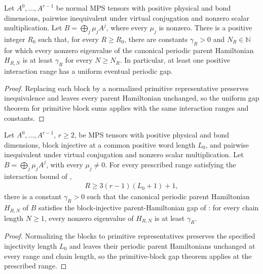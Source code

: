 \begin{lemma}
    \label{thm:normal_block_sum_parent_gap}
    \leanok
    Let $A^0,\ldots,A^{r-1}$ be normal MPS tensors with positive physical and
    bond dimensions, pairwise inequivalent under virtual conjugation and
    nonzero scalar multiplication. Let $B=\bigoplus_j\mu_j A^j$, where
    every $\mu_j$ is nonzero.
    There is a positive integer $R_0$ such that, for every $R\geq R_0$,
    there are constants $\gamma_R>0$ and $N_R\in\mathbb N$ for which
    every nonzero eigenvalue of the canonical periodic parent Hamiltonian
    $H_{R,N}$ is at least $\gamma_R$ for every $N\geq N_R$.
    In particular, at least one positive interaction range has a uniform
    eventual periodic gap.
\end{lemma}
\begin{proof}\leanok
    Replacing each block by a normalized primitive representative preserves
    inequivalence and leaves every parent Hamiltonian unchanged, so the uniform
    gap theorem for primitive block sums applies with the same
    interaction ranges and constants.
\end{proof}

\begin{lemma}
    \label{thm:normal-block-parent-gap-three-block-bound}
    \leanok
    Let $A^0,\ldots,A^{r-1}$, $r\geq2$, be MPS tensors with positive
    physical and bond dimensions, block injective at a common positive word
    length $L_0$, and pairwise inequivalent under virtual conjugation and nonzero
    scalar multiplication. Let $B=\bigoplus_j\mu_j A^j$, with every
    $\mu_j\ne0$. For every prescribed range satisfying the interaction bound of
    \cite[Theorem~12]{PerezGarcia2007Matrix},
    \begin{align}
        R\geq3(r-1)(L_0+1)+1,
    \end{align}
    there is a constant $\gamma_R>0$ such that the canonical periodic parent
    Hamiltonian $H_{R,N}$ of $B$ satisfies the block-injective
    parent-Hamiltonian gap of \cite[Section~IV.C]{Cirac2021Matrix}: for
    every chain length $N\geq1$, every nonzero eigenvalue of $H_{R,N}$ is at
    least $\gamma_R$.
\end{lemma}
\begin{proof}\leanok
    Normalizing the blocks to primitive representatives preserves the
    specified injectivity length $L_0$ and leaves their periodic parent Hamiltonians
    unchanged at every range and chain length, so the
    primitive-block gap theorem applies at the prescribed range.
\end{proof}

